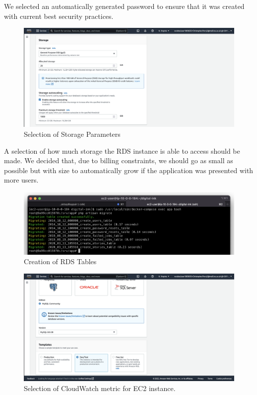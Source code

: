 We selected an automatically generated password to ensure that it was created with current best security practices.

\begin{figure}[!htbp]
    \centering
    \includegraphics[width=\textwidth]{resources/rds/rds-storage.png}
    \caption{Selection of Storage Parameters}
    \label{fig:rds-storage}
\end{figure}

A selection of how much storage the RDS instance is able to access should be made. We decided that, due to billing constraints, we should go as small as possible but with size to automatically grow if the application was presented with more users.

\begin{figure}[!htbp]
    \centering
    \includegraphics[width=\textwidth]{resources/rds/rds-tables-creation.png}
    \caption{Creation of RDS Tables}
    \label{fig:rds-tables}
\end{figure}


\begin{figure}[!htbp]
\centering
\includegraphics[width=\textwidth]{resources/rds/rds-templates.png}
\caption{Selection of CloudWatch metric for EC2 instance.}
\label{fig:rds-templates}
\end{figure}


